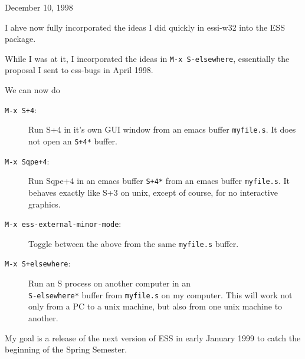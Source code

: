 \documentclass[12pt]{article}         %
\newcommand{\tty}[1]{{\tt #1}}
\begin{document}
December 10, 1998

I ahve now fully incorporated the ideas I did quickly in  essi-w32 into the ESS
package.

While I was at it, I incorporated the ideas in \tty{M-x S-elsewhere}, essentially the
proposal I sent to ess-bugs in April 1998.

We can now do
\begin{description}
\item[\tty{M-x S+4}:]
Run S+4 in it's own GUI window from an emacs buffer \tty{myfile.s}.
It does not open an \tty{*S+4*} buffer.
\item[\tty{M-x Sqpe+4}:]
Run Sqpe+4 in an emacs buffer \tty{*S+4*} from an emacs buffer \tty{myfile.s}.
It behaves exactly like S+3 on unix, except of course, for no interactive graphics.
\item[\tty{M-x ess-external-minor-mode}:]
Toggle between the above from the same \tty{myfile.s} buffer.
\item[\tty{M-x S+elsewhere}:]
Run an S process on another computer in an\\
\tty{*S-elsewhere*} buffer
from \tty{myfile.s} on my computer.  This will work not only from a PC
to a unix machine, but also from one unix machine to another.
\end{description}

My goal is a release of the next version of ESS in early January
1999 to catch the beginning of the Spring Semester.
\end{document}

